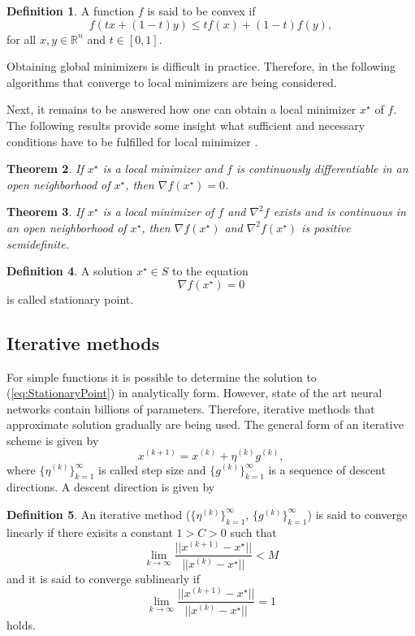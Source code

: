 \documentclass[12pt]{article}
\newtheorem{theorem}{Theorem}[section]
\theoremstyle{definition}
\newtheorem{definition}[theorem]{Definition}
\numberwithin{equation}{section}
\begin{document}
\begin{definition}
  A function $f$ is said to be convex if 
  \begin{equation}
    f(tx+(1-t)y) \leq tf(x)+(1-t)f(y),
  \end{equation}
  for all $x,y \in \mathbb{R}^n$ and $t \in [0,1]$.
\end{definition}
Obtaining global minimizers is difficult in practice. Therefore, in the following algorithms that converge to local minimizers are being considered.

Next, it remains to be answered how one can obtain a local minimizer $x^\star$ of $f$.
The following results provide some insight what sufficient and necessary conditions have to be fulfilled for local minimizer \cite{nocedal1999numerical}.
\begin{theorem}
  If $x^\star$ is a local minimizer and $f$ is continuously differentiable in an open neighborhood of $x^\star$, then $\nabla f(x^\star) = 0$.
\end{theorem}
\begin{theorem}
  If $x^\star$ is a local minimizer of $f$ and $\nabla^2 f$ exists and is continuous in an open neighborhood of $x^\star$, then $\nabla f(x^\star)$ and $\nabla^2f(x^\star)$ is positive semidefinite.
\end{theorem}
\begin{definition}
  A solution $x^\star \in S$ to the equation
  \begin{equation}
  \label{eq:StationaryPoint}
    \nabla f(x^\star) = 0
  \end{equation}
  is called stationary point.
\end{definition}
\subsection{Iterative methods}
For simple functions it is possible to determine the solution to (\ref*{eq:StationaryPoint})
in analytically form. However, state of the art neural networks contain billions of parameters. Therefore, iterative methods that approximate solution gradually are being used. The general form of an iterative scheme is given by
\begin{equation}
  x^{(k+1)} = x^{(k)} + \eta^{(k)} g^{(k)},
\end{equation}
where $\{\eta^{(k)}\}_{k=1}^\infty$ is called step size and $\{g^{(k)}\}_{k=1}^\infty$ is a sequence of descent directions. A descent direction is given by 

\begin{definition}
  An iterative method ($\{\eta^{(k)}\}_{k=1}^\infty$, $\{g^{(k)}\}_{k=1}^\infty$) is said to converge linearly if there exisits a constant $1 > C > 0$ such that 
  \begin{equation}
    \lim_{k \rightarrow \infty} \frac{||x^{(k+1)} - x^\star||}{||x^{(k)} - x^\star||} < M
  \end{equation}
  and it is said to converge sublinearly if 
  \begin{equation}
    \lim_{k \rightarrow \infty} \frac{||x^{(k+1)} - x^\star||}{||x^{(k)} - x^\star||} = 1
  \end{equation}
  holds.
\end{definition}
\end{document}
